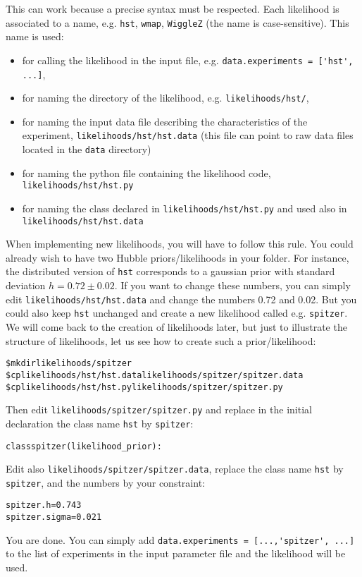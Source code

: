 \documentclass[10pt]{article}
\begin{document}
This can work because a precise syntax must be respected. Each likelihood is
associated to a name, e.g. \verb?hst?,  \verb?wmap?,  \verb?WiggleZ? (the name
is case-sensitive). This name is used:
\begin{itemize}
\item for calling the likelihood in the input file, e.g. \verb?data.experiments = ['hst', ...]?,
\item for naming the directory of the likelihood, e.g. \verb?likelihoods/hst/?,
\item for naming the input data file describing the characteristics of the experiment,  \verb?likelihoods/hst/hst.data? (this file can point to raw data files located in the \verb?data? directory)
\item for naming the python file containing the likelihood code,  \verb?likelihoods/hst/hst.py? 
\item for naming the class declared in \verb?likelihoods/hst/hst.py? and used also in \verb?likelihoods/hst/hst.data?
\end{itemize}
When  implementing new likelihoods, you will have to follow this rule. You
could already wish to have two Hubble priors/likelihoods in your folder. For
instance, the distributed version of \verb?hst? corresponds to a gaussian prior
with standard deviation $h=0.72\pm0.02$. If you want to change these numbers,
you can simply edit \verb?likelihoods/hst/hst.data? and change the numbers 0.72
and 0.02. But you could also keep \verb?hst? unchanged and create a new
likelihood called e.g. \verb?spitzer?. We will come back to the creation of
likelihoods later, but just to illustrate the structure of likelihoods, let us
see how to create such a prior/likelihood:
\begin{alltt}
\$ mkdir likelihoods/spitzer
\$ cp likelihoods/hst/hst.data likelihoods/spitzer/spitzer.data
\$ cp likelihoods/hst/hst.py likelihoods/spitzer/spitzer.py
\end{alltt}
Then edit \verb?likelihoods/spitzer/spitzer.py? and replace in the initial declaration the class name \verb?hst? by \verb?spitzer?:
\begin{alltt}
class spitzer(likelihood_prior):
\end{alltt}
Edit also \verb?likelihoods/spitzer/spitzer.data?, replace the class name \verb?hst? by \verb?spitzer?, and the numbers by your constraint:
\begin{alltt}
spitzer.h = 0.743
spitzer.sigma = 0.021
\end{alltt}
You are done. You can simply add \verb?data.experiments = [...,'spitzer', ...]? to the list of experiments in the input parameter file and the likelihood will be used.
\end{document}
